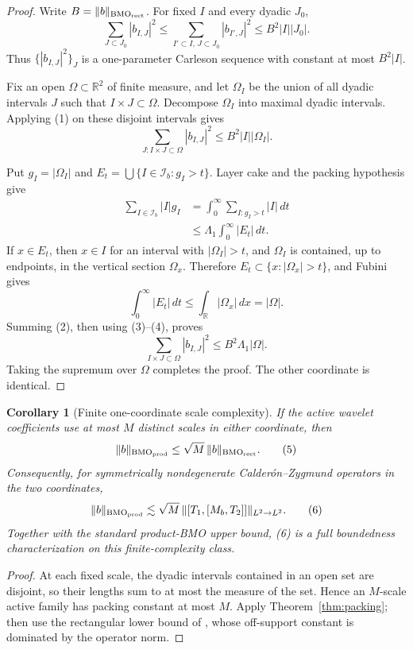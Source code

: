 \documentclass[11pt]{article}
\newtheorem{corollary}[theorem]{Corollary}
\newcommand{\BMO}{\mathrm{BMO}}
\newcommand{\R}{\mathbb R}
\newcommand{\cI}{\mathcal I}
\begin{document}
\begin{proof}
Write $B=\|b\|_{\BMO_{\rm rect}}$.  For fixed $I$ and every dyadic $J_0$,
\[
 \sum_{J\subset J_0}|b_{I,J}|^2
 \le \sum_{I'\subset I,\,J\subset J_0}|b_{I',J}|^2
 \le B^2|I||J_0|.                                      \tag{1}
\]
Thus $\{|b_{I,J}|^2\}_J$ is a one-parameter Carleson sequence with constant
at most $B^2|I|$.

Fix an open $\Omega\subset\R^2$ of finite measure, and let $\Omega_I$ be the
union of all dyadic intervals $J$ such that $I\times J\subset\Omega$.
Decompose $\Omega_I$ into maximal dyadic intervals.  Applying (1) on these
disjoint intervals gives
\[
 \sum_{J:I\times J\subset\Omega}|b_{I,J}|^2
 \le B^2|I||\Omega_I|.                                  \tag{2}
\]

Put $g_I=|\Omega_I|$ and
$E_t=\bigcup\{I\in\cI_b:g_I>t\}$.  Layer cake and the packing hypothesis
give
\begin{align*}
 \sum_{I\in\cI_b}|I|g_I
 &=\int_0^\infty\sum_{I:g_I>t}|I|\,dt\\
 &\le\Lambda_1\int_0^\infty|E_t|\,dt.                  \tag{3}
\end{align*}
If $x\in E_t$, then $x\in I$ for an interval with $|\Omega_I|>t$, and
$\Omega_I$ is contained, up to endpoints, in the vertical section
$\Omega_x$.  Therefore $E_t\subset\{x:|\Omega_x|>t\}$, and Fubini gives
\[
 \int_0^\infty|E_t|\,dt
 \le\int_{\R}|\Omega_x|\,dx=|\Omega|.                  \tag{4}
\]
Summing (2), then using (3)--(4), proves
\[
 \sum_{I\times J\subset\Omega}|b_{I,J}|^2
 \le B^2\Lambda_1|\Omega|.
\]
Taking the supremum over $\Omega$ completes the proof.  The other coordinate
is identical.
\end{proof}

\begin{corollary}[Finite one-coordinate scale complexity]
If the active wavelet coefficients use at most $M$ distinct scales in either
coordinate, then
\[
 \|b\|_{\BMO_{\rm prod}}
 \le\sqrt M\,\|b\|_{\BMO_{\rm rect}}.                  \tag{5}
\]
Consequently, for symmetrically nondegenerate Calderón--Zygmund operators in
the two coordinates,
\[
 \|b\|_{\BMO_{\rm prod}}
 \lesssim\sqrt M\,
 \|[T_1,[M_b,T_2]]\|_{L^2\to L^2}.                    \tag{6}
\]
Together with the standard product-BMO upper bound, (6) is a full
boundedness characterization on this finite-complexity class.
\end{corollary}

\begin{proof}
At each fixed scale, the dyadic intervals contained in an open set are
disjoint, so their lengths sum to at most the measure of the set.  Hence an
$M$-scale active family has packing constant at most $M$.  Apply
Theorem~\ref{thm:packing}; then use the rectangular lower bound of
\cite[Proposition 5.3]{AHLMO}, whose off-support constant is dominated by the
operator norm.
\end{proof}
\end{document}
